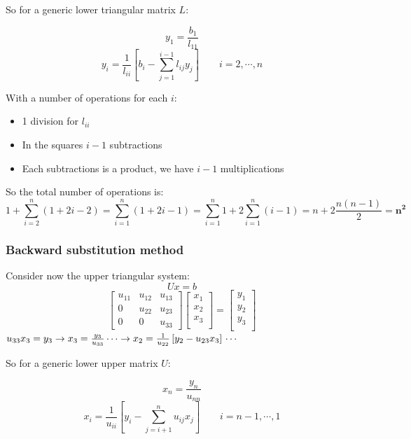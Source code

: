 So for a generic lower triangular matrix $L$:
\begin{LARGE}
    $$
    y_1=\frac{b_1}{l_{11}}
    $$
    $$
    y_i=\frac{1}{l_{ii}}\left[b_i-\sum_{j=1}^{i-1}l_{ij}y_j\right] \qquad i=2,\cdots,n
    $$
\end{LARGE}

With a number of operations for each $i$:
\begin{itemize}
    \item 1 division for $l_{ii}$
    \item In the squares $i-1$ subtractions
    \item Each subtractions is a product, we have $i-1$ multiplications
\end{itemize}
So the total number of operations is:
$$
1+\sum_{i=2}^n(1+2i-2)=\sum_{i=1}^n(1+2i-1)=\sum_{i=1}^n1+2\sum_{i=1}^n(i-1)=n+2\frac{n(n-1)}{2}=\mathbf{n^2}
$$

\subsubsection{Backward substitution method}
Consider now the upper triangular system:
$$
Ux=b
$$
$$
\begin{bmatrix}
    u_{11} & u_{12} & u_{13}\\
    0 & u_{22} & u_{23}\\
    0 & 0 & u_{33}
\end{bmatrix}
\begin{bmatrix}
    x_1\\
    x_2\\
    x_3\\
\end{bmatrix}=
\begin{bmatrix}
    y_1\\
    y_2\\
    y_3\\
\end{bmatrix}
$$
$
u_{33}x_3=y_3\rightarrow x_3=\frac{y_3}{u_{33}}\\
\\
\cdots\rightarrow x_2=\frac{1}{u_{22}}\left[y_2-u_{23}x_3\right]\\
\\
\cdots
$

So for a generic lower upper matrix $U$:
\begin{LARGE}
    $$
    x_n=\frac{y_n}{u_{nn}}
    $$
    $$
    x_i=\frac{1}{u_{ii}}\left[y_i-\sum_{j=i+1}^{n}u_{ij}x_j\right] \qquad i=n-1,\cdots,1
    $$
\end{LARGE}

